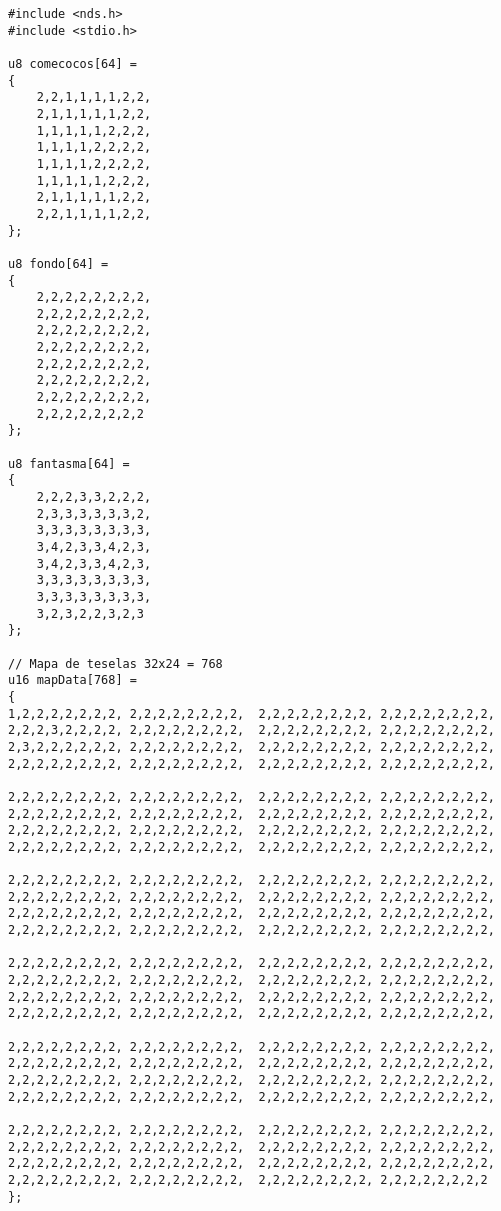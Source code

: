\begin{lstlisting}
#include <nds.h>
#include <stdio.h>

u8 comecocos[64] =
{
	2,2,1,1,1,1,2,2,
	2,1,1,1,1,1,2,2,
	1,1,1,1,1,2,2,2,
	1,1,1,1,2,2,2,2,
	1,1,1,1,2,2,2,2,
	1,1,1,1,1,2,2,2,
	2,1,1,1,1,1,2,2,
	2,2,1,1,1,1,2,2,
};

u8 fondo[64] =
{
	2,2,2,2,2,2,2,2,
	2,2,2,2,2,2,2,2,
	2,2,2,2,2,2,2,2,
	2,2,2,2,2,2,2,2,
	2,2,2,2,2,2,2,2,
	2,2,2,2,2,2,2,2,
	2,2,2,2,2,2,2,2,
	2,2,2,2,2,2,2,2
};

u8 fantasma[64] =
{
	2,2,2,3,3,2,2,2,
	2,3,3,3,3,3,3,2,
	3,3,3,3,3,3,3,3,
	3,4,2,3,3,4,2,3,
	3,4,2,3,3,4,2,3,
	3,3,3,3,3,3,3,3,
	3,3,3,3,3,3,3,3,
	3,2,3,2,2,3,2,3
};

// Mapa de teselas 32x24 = 768
u16 mapData[768] =
{
1,2,2,2,2,2,2,2, 2,2,2,2,2,2,2,2,  2,2,2,2,2,2,2,2, 2,2,2,2,2,2,2,2,
2,2,2,3,2,2,2,2, 2,2,2,2,2,2,2,2,  2,2,2,2,2,2,2,2, 2,2,2,2,2,2,2,2,
2,3,2,2,2,2,2,2, 2,2,2,2,2,2,2,2,  2,2,2,2,2,2,2,2, 2,2,2,2,2,2,2,2,
2,2,2,2,2,2,2,2, 2,2,2,2,2,2,2,2,  2,2,2,2,2,2,2,2, 2,2,2,2,2,2,2,2,

2,2,2,2,2,2,2,2, 2,2,2,2,2,2,2,2,  2,2,2,2,2,2,2,2, 2,2,2,2,2,2,2,2,
2,2,2,2,2,2,2,2, 2,2,2,2,2,2,2,2,  2,2,2,2,2,2,2,2, 2,2,2,2,2,2,2,2,
2,2,2,2,2,2,2,2, 2,2,2,2,2,2,2,2,  2,2,2,2,2,2,2,2, 2,2,2,2,2,2,2,2,
2,2,2,2,2,2,2,2, 2,2,2,2,2,2,2,2,  2,2,2,2,2,2,2,2, 2,2,2,2,2,2,2,2,

2,2,2,2,2,2,2,2, 2,2,2,2,2,2,2,2,  2,2,2,2,2,2,2,2, 2,2,2,2,2,2,2,2,
2,2,2,2,2,2,2,2, 2,2,2,2,2,2,2,2,  2,2,2,2,2,2,2,2, 2,2,2,2,2,2,2,2,
2,2,2,2,2,2,2,2, 2,2,2,2,2,2,2,2,  2,2,2,2,2,2,2,2, 2,2,2,2,2,2,2,2,
2,2,2,2,2,2,2,2, 2,2,2,2,2,2,2,2,  2,2,2,2,2,2,2,2, 2,2,2,2,2,2,2,2,

2,2,2,2,2,2,2,2, 2,2,2,2,2,2,2,2,  2,2,2,2,2,2,2,2, 2,2,2,2,2,2,2,2,
2,2,2,2,2,2,2,2, 2,2,2,2,2,2,2,2,  2,2,2,2,2,2,2,2, 2,2,2,2,2,2,2,2,
2,2,2,2,2,2,2,2, 2,2,2,2,2,2,2,2,  2,2,2,2,2,2,2,2, 2,2,2,2,2,2,2,2,
2,2,2,2,2,2,2,2, 2,2,2,2,2,2,2,2,  2,2,2,2,2,2,2,2, 2,2,2,2,2,2,2,2,

2,2,2,2,2,2,2,2, 2,2,2,2,2,2,2,2,  2,2,2,2,2,2,2,2, 2,2,2,2,2,2,2,2,
2,2,2,2,2,2,2,2, 2,2,2,2,2,2,2,2,  2,2,2,2,2,2,2,2, 2,2,2,2,2,2,2,2,
2,2,2,2,2,2,2,2, 2,2,2,2,2,2,2,2,  2,2,2,2,2,2,2,2, 2,2,2,2,2,2,2,2,
2,2,2,2,2,2,2,2, 2,2,2,2,2,2,2,2,  2,2,2,2,2,2,2,2, 2,2,2,2,2,2,2,2,

2,2,2,2,2,2,2,2, 2,2,2,2,2,2,2,2,  2,2,2,2,2,2,2,2, 2,2,2,2,2,2,2,2,
2,2,2,2,2,2,2,2, 2,2,2,2,2,2,2,2,  2,2,2,2,2,2,2,2, 2,2,2,2,2,2,2,2,
2,2,2,2,2,2,2,2, 2,2,2,2,2,2,2,2,  2,2,2,2,2,2,2,2, 2,2,2,2,2,2,2,2,
2,2,2,2,2,2,2,2, 2,2,2,2,2,2,2,2,  2,2,2,2,2,2,2,2, 2,2,2,2,2,2,2,2
};


\end{lstlisting}
